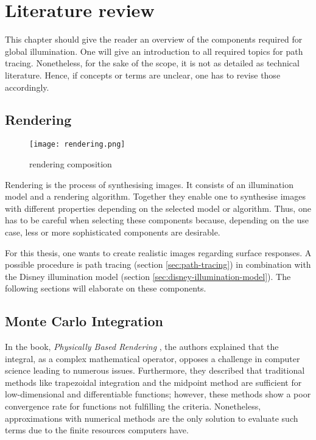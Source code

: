 \chapter{Literature review}

This chapter should give the reader an overview of the components required for global illumination.
One will give an introduction to all required topics for path tracing. Nonetheless, for the sake of the scope, it is not as detailed as technical literature.
Hence, if concepts or terms are unclear, one has to revise those accordingly.

\section{Rendering}

\begin{figure}[h]
    \begin{center}
        \texttt{[image: rendering.png]}
    \end{center}
    \caption[]{rendering composition \cite{duin_beleuchtungsalgorithmen_1993}}
    \label{fig:rendering}
\end{figure}

Rendering is the process of synthesising images.
It consists of an illumination model and a rendering algorithm.
Together they enable one to synthesise images with different properties depending on the selected model or algorithm.
Thus, one has to be careful when selecting these components because, depending on the use case, less or more sophisticated components are desirable.

For this thesis, one wants to create realistic images regarding surface responses.
A possible procedure is path tracing (section \ref{sec:path-tracing}) in combination with the Disney illumination model (section \ref{sec:disney-illumination-model}).
The following sections will elaborate on these components.

\section{Monte Carlo Integration}

In the book, \textit{Physically Based Rendering} \cite{pharr_physically_2017}, the authors explained that the integral, as a complex mathematical operator, opposes a challenge in computer science leading to numerous issues.
Furthermore, they described that traditional methods like trapezoidal integration and the midpoint method are sufficient for low-dimensional and differentiable functions; however, these methods show a poor convergence rate for functions not fulfilling the criteria.
Nonetheless, approximations with numerical methods are the only solution to evaluate such terms due to the finite resources computers have.

